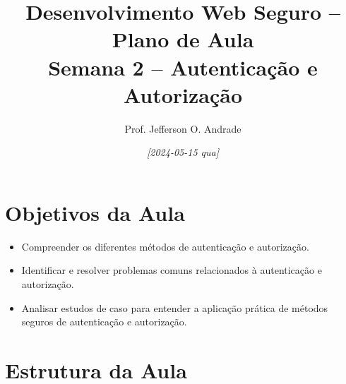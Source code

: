 \documentclass{scrartcl}
\author{Prof. Jefferson O. Andrade}
\date{\textit{[2024-05-15 qua]}}
\title{Desenvolvimento Web Seguro -- Plano de Aula\\\medskip
\large Semana 2 -- Autenticação e Autorização}
\begin{document}
\maketitle

\section{Objetivos da Aula}
\label{sec:org5dab1b6}
\begin{itemize}
\item Compreender os diferentes métodos de autenticação e autorização.
\item Identificar e resolver problemas comuns relacionados à autenticação e
autorização.
\item Analisar estudos de caso para entender a aplicação prática de métodos seguros
de autenticação e autorização.
\end{itemize}

\section{Estrutura da Aula}
\label{sec:org68e3f16}
\end{document}
